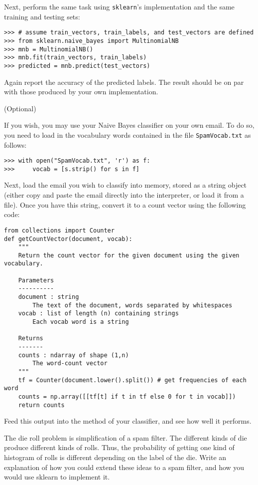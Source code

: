 Next, perform the same task using {\tt sklearn}'s implementation and the same training and testing sets:
\begin{lstlisting}
>>> # assume train_vectors, train_labels, and test_vectors are defined
>>> from sklearn.naive_bayes import MultinomialNB
>>> mnb = MultinomialNB()
>>> mnb.fit(train_vectors, train_labels)
>>> predicted = mnb.predict(test_vectors)
\end{lstlisting}
Again report the accuracy of the predicted labels. The result should be on par with those produced by your
own implementation.

(Optional)

If you wish, you may use your Naive Bayes classifier on your own email.
To do so, you need to load in the vocabulary words contained in the file {\tt SpamVocab.txt} as follows:
\begin{lstlisting}
>>> with open("SpamVocab.txt", 'r') as f:
>>>     vocab = [s.strip() for s in f]
\end{lstlisting}
Next, load the email you wish to classify into memory, stored as a string object (either copy and paste the email
directly into the interpreter, or load it from a file). Once you have this string, convert it to a count vector using
the following code:
\begin{lstlisting}
from collections import Counter
def getCountVector(document, vocab):
    """
    Return the count vector for the given document using the given vocabulary.

    Parameters
    ----------
    document : string
		The text of the document, words separated by whitespaces
    vocab : list of length (n) containing strings
		Each vocab word is a string

    Returns
    -------
    counts : ndarray of shape (1,n)
		The word-count vector
    """
    tf = Counter(document.lower().split()) # get frequencies of each word
    counts = np.array([[tf[t] if t in tf else 0 for t in vocab]])
    return counts
\end{lstlisting}
Feed this output into the  method of your classifier, and see how well it performs.

The die roll problem is simplification of a spam filter.
The different kinds of die produce different kinds of rolls.
Thus, the probability of getting one kind of histogram of rolls is different depending on the label of the die.
Write an explanation of how you could extend these ideas to a spam filter, and how you would use {sklearn} to implement it.
